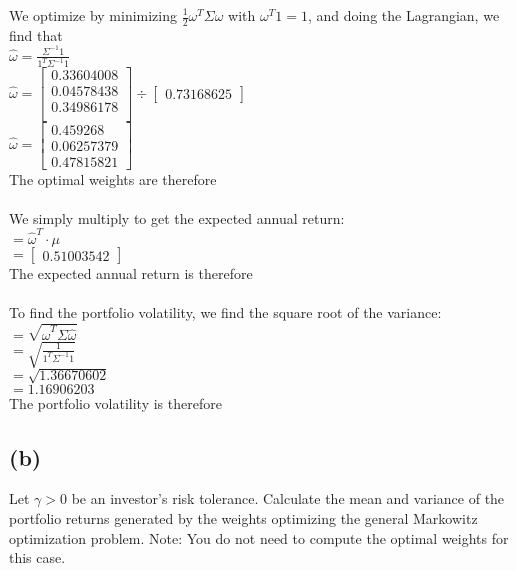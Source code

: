 \documentclass{article}
\begin{document}
{We optimize by minimizing $\frac{1}{2} \omega^T \Sigma \omega$ with $\omega^T 1 = 1$, and doing the Lagrangian, we find that \\
$\widehat{\omega} = \frac{\Sigma^{-1}1}{1^T\Sigma^{-1}1}$ \\
$\widehat{\omega} = 
\begin{bmatrix}
  0.33604008 \\ 
  0.04578438 \\ 
  0.34986178 \\ 
\end{bmatrix} 
\div
\begin{bmatrix}
  0.73168625
\end{bmatrix}$ \\
$\widehat{\omega} = 
\begin{bmatrix}
  0.459268 \\ 
  0.06257379 \\
  0.47815821
\end{bmatrix}$ \\
The optimal weights are therefore  \\ \\ 
We simply multiply to get the expected annual return: \\
$= \widehat{\omega}^T \cdot  \mu$ \\
$=
\begin{bmatrix}
  0.51003542
\end{bmatrix}$ \\
The expected annual return is therefore  \\ \\
To find the portfolio volatility, we find the square root of the variance: \\
$= \sqrt{\widehat{\omega}^T \Sigma \widehat{\omega}}$ \\
$= \sqrt{\frac{1}{1^T \Sigma^{-1} 1}}$ \\
$= \sqrt{1.36670602}$ \\
$= 1.16906203$ \\
The portfolio volatility is therefore 

\subsection*{(b)}

Let $\gamma > 0$ be an investor’s risk tolerance. Calculate the mean and variance of the portfolio returns generated by the weights optimizing the general Markowitz optimization problem. Note: You do not need to compute the optimal weights for this case.

}
\end{document}
